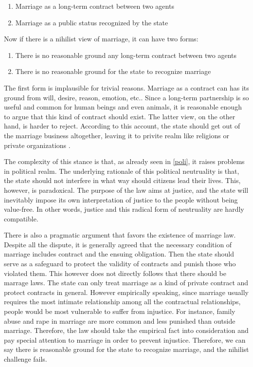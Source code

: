 \documentclass{article}
\begin{document}
\begin{enumerate}
\item {Marriage as a long-term contract between two agents}
\item {Marriage as a public status recognized by the state}
\end{enumerate}

Now if there is a nihilist view of marriage, it can have two forms:

\begin{enumerate}
\item {There is no reasonable ground any long-term contract between two agents}
\item {There is no reasonable ground for the state to recognize marriage}
\end{enumerate}

The first form is implausible for trivial reasons. Marriage as a contract can has its ground from will, desire, reason, emotion, etc.. Since a long-term partnership is so useful and common for human beings and even animals, it is reasonable enough to argue that this kind of contract should exist. The latter view, on the other hand, is harder to reject. According to this account, the state should get out of the marriage business altogether, leaving it to privite realm like religions or private organizations \autocite{sunsteinPrivatizingMarriage2008,chartierPublicPracticePrivate2016}.

The complexity of this stance is that, as already seen in \ref{poli}, it raises problems in political realm. The underlying rationale of this political neutruality is that, the state should not interfere in what way should citizens lead their lives. This, however, is paradoxical. The purpose of the law aims at justice, and the state will inevitably impose its own interpretation of justice to the people without being value-free. In other words, justice and this radical form of neutruality are hardly compatible. 

There is also a pragmatic argument that favors the existence of marriage law. Despite all the dispute, it is generally agreed that the necessary condition of marriage includes contract and the ensuing obligation.\autocite{brakeMarriageDomesticPartnership2023} Then the state should serve as a safeguard to protect the validity of contracts and punish those who violated them. This however does not directly follows that there should be marrage laws. The state can only treat marriage as a kind of private contract and protect contracts in general. However empirically speaking, since marriage usually requires the most intimate relationship among all the contractual relationships, people would be most vulnerable to suffer from injustice. For instance, family abuse and rape in marriage are more common and less punished than outside marriage. Therefore, the law should take the empirical fact into consideration and pay special attention to marriage in order to prevent injustice. Therefore, we can say there is reasonable ground for the state to recognize marriage, and the nihilist challenge fails.
\end{document}
